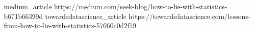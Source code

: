 \documentclass{classrep}
\begin{document}
    \begin{thebibliography}{0}
        \bibitem
        {medium_article}
        {https://medium.com/seek-blog/how-to-lie-with-statistics-b671b66399d}
        \bibitem
        {towardsdatascience_article}
        {https://towardsdatascience.com/lessons-from-how-to-lie-with-statistics-57060c0d2f19}
    \end{thebibliography}
\end{document}
